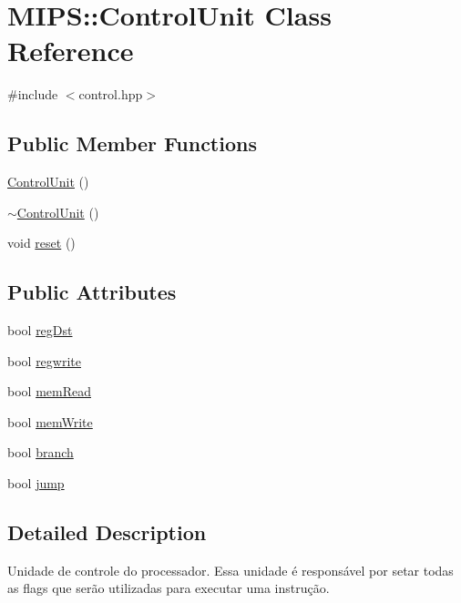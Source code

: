 \hypertarget{classMIPS_1_1ControlUnit}{}\section{M\+I\+PS\+:\+:Control\+Unit Class Reference}
\label{classMIPS_1_1ControlUnit}


{\ttfamily \#include $<$control.\+hpp$>$}

\subsection*{Public Member Functions}
\begin{DoxyCompactItemize}
\item 
\hyperlink{classMIPS_1_1ControlUnit_a4e7f136cf15bc78b878082ba5fe5b629}{Control\+Unit} ()
\item 
\hyperlink{classMIPS_1_1ControlUnit_a6e1a1d7cd85594c9a575a432770c3aa2}{$\sim$\+Control\+Unit} ()
\item 
void \hyperlink{classMIPS_1_1ControlUnit_a7de8a744457b38df762e7f9ed67ce3ef}{reset} ()
\end{DoxyCompactItemize}
\subsection*{Public Attributes}
\begin{DoxyCompactItemize}
\item 
bool \hyperlink{classMIPS_1_1ControlUnit_a4efae70e7973481e3f1bb8f91ba22322}{reg\+Dst}
\item 
bool \hyperlink{classMIPS_1_1ControlUnit_a18884b753a77aa99c9ff404e16c6ac7a}{regwrite}
\item 
bool \hyperlink{classMIPS_1_1ControlUnit_abe9e61b37cb75b89cdde98446d89e89d}{mem\+Read}
\item 
bool \hyperlink{classMIPS_1_1ControlUnit_aba0c87c1f08276807cd241a9484980bc}{mem\+Write}
\item 
bool \hyperlink{classMIPS_1_1ControlUnit_aa19c9a24c47bdde835e273e81a485e28}{branch}
\item 
bool \hyperlink{classMIPS_1_1ControlUnit_a13c01a649cd685fc1a52e3c3c45e96e7}{jump}
\end{DoxyCompactItemize}


\subsection{Detailed Description}
Unidade de controle do processador. Essa unidade é responsável por setar todas as flags que serão utilizadas para executar uma instrução.

